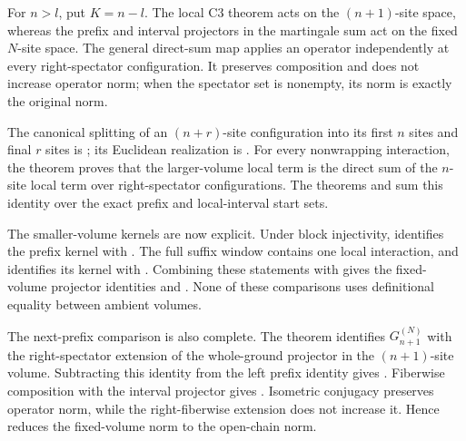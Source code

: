 \documentclass{article}
\begin{document}
For $n>l$, put $K=n-l$.  The local C3 theorem acts on the $(n+1)$-site space,
whereas the prefix and interval projectors in the martingale sum act on the
fixed $N$-site space.  The general direct-sum map
 applies an operator independently
at every right-spectator configuration.  It preserves composition and does not
increase operator norm; when the spectator set is nonempty, its norm is exactly
the original norm.

The canonical splitting of an $(n+r)$-site configuration into its first $n$
sites and final $r$ sites is
; its Euclidean realization is
.  For every
nonwrapping interaction, the theorem
proves that the larger-volume local term is the direct sum of the $n$-site
local term over right-spectator configurations.  The theorems
and
sum this identity over the exact prefix and local-interval start sets.

The smaller-volume kernels are now explicit.  Under block injectivity,
identifies the prefix kernel with
.  The full suffix window contains
one local interaction, and
identifies its kernel with
.  Combining these statements with
 gives the
fixed-volume projector identities
and
.
None of these comparisons uses definitional equality between ambient volumes.

The next-prefix comparison is also complete.
The theorem
identifies $G_{n+1}^{(N)}$ with the right-spectator extension of the whole-ground
projector in the $(n+1)$-site volume.  Subtracting this identity from the left
prefix identity gives
.
Fiberwise composition with the interval projector gives
.
Isometric conjugacy preserves operator norm, while the right-fiberwise
extension does not increase it.  Hence
reduces the fixed-volume norm to the open-chain norm.
\end{document}
